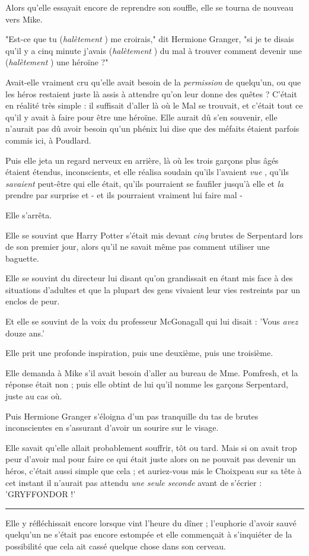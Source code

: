 Alors qu'elle essayait encore de reprendre son souffle, elle se tourna de nouveau vers Mike.

"Est-ce que tu (\emph{halètement} ) me croirais," dit Hermione Granger, "si je te disais qu'il y a cinq minute j'avais (\emph{halètement} ) du mal à trouver comment devenir une (\emph{halètement} ) une héroïne ?"

Avait-elle vraiment cru qu'elle avait besoin de la \emph{permission}  de quelqu'un, ou que les héros restaient juste là assis à attendre qu'on leur donne des quêtes ? C'était en réalité très simple : il suffisait d'aller là où le Mal se trouvait, et c'était tout ce qu'il y avait à faire pour être une héroïne. Elle aurait dû s'en souvenir, elle n'aurait pas dû avoir besoin qu'un phénix lui dise que des méfaits étaient parfois commis ici, à Poudlard.

Puis elle jeta un regard nerveux en arrière, là où les trois garçons plus âgés étaient étendus, inconscients, et elle réalisa soudain qu'ils l'avaient \emph{vue} , qu'ils \emph{savaient}  peut-être qui elle était, qu'ils pourraient se faufiler jusqu'à elle et \emph{la}  prendre par surprise et - et ils pourraient vraiment lui faire mal -

Elle s'arrêta.

Elle se souvint que Harry Potter s'était mis devant \emph{cinq}  brutes de Serpentard lors de son premier jour, alors qu'il ne savait même pas comment utiliser une baguette.

Elle se souvint du directeur lui disant qu'on grandissait en étant mis face à des situations d'adultes et que la plupart des gens vivaient leur vies restreints par un enclos de peur.

Et elle se souvint de la voix du professeur McGonagall qui lui disait : 'Vous \emph{avez}  douze ans.'

Elle prit une profonde inspiration, puis une deuxième, puis une troisième.

Elle demanda à Mike s'il avait besoin d'aller au bureau de Mme. Pomfresh, et la réponse était non ; puis elle obtint de lui qu'il nomme les garçons Serpentard, juste au cas où.

Puis Hermione Granger s'éloigna d'un pas tranquille du tas de brutes inconscientes en s'assurant d'avoir un sourire sur le visage.

Elle savait qu'elle allait probablement souffrir, tôt ou tard. Mais si on avait trop peur d'avoir mal pour faire ce qui était juste alors on ne pouvait pas devenir un héros, c'était aussi simple que cela ; et auriez-vous mis le Choixpeau sur sa tête à cet instant il n'aurait pas attendu \emph{une seule seconde}  avant de s'écrier : 'GRYFFONDOR !'
\par\noindent\rule{\textwidth}{0.4pt}
Elle y réfléchissait encore lorsque vint l'heure du dîner ; l'euphorie d'avoir sauvé quelqu'un ne s'était pas encore estompée et elle commençait à s'inquiéter de la possibilité que cela ait cassé quelque chose dans son cerveau.

